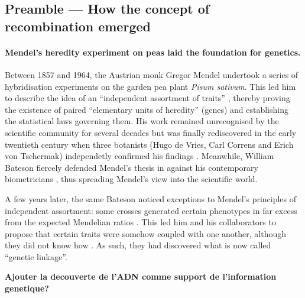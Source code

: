 \subsection*{Preamble — How the concept of recombination emerged}

\paragraph{Mendel's heredity experiment on peas laid the foundation for genetics.}
Between 1857 and 1964, the Austrian monk Gregor Mendel undertook a series of hybridisation experiments on the garden pea plant \textit{Pisum sativum}. This led him to describe the idea of an “independent assortment of traits” \citep{mendel1996experiments}, thereby proving the existence of paired “elementary units of heredity” (genes) and establishing the statistical laws governing them.
His work remained unrecognised by the scientific community for several decades but was finally rediscovered in the early twentieth century when three botanists (Hugo de Vries, Carl Correns and Erich von Tschermak) independetly confirmed his findings \citep{dunn2003gregor}.
Meanwhile, William Bateson fiercely defended Mendel's thesis in \textit{} \citep{bateson1902mendel} against his contemporary biometricians \citep[reviewed in][]{bateson2002william}, thus spreading Mendel's view into the scientific world.

A few years later, the same Bateson noticed exceptions to Mendel's principles of independent assortment: some crosses generated certain phenotypes in far excess from the expected Mendelian ratios \citep{bateson1905experimentalpea}. This led him and his collaborators to propose that certain traits were somehow coupled with one another, although they did not know how \citep{bateson1905experimental}. 
As such, they had discovered what is now called “genetic linkage”.


\textbf{Ajouter la decouverte de l'ADN comme support de l'information genetique?}


